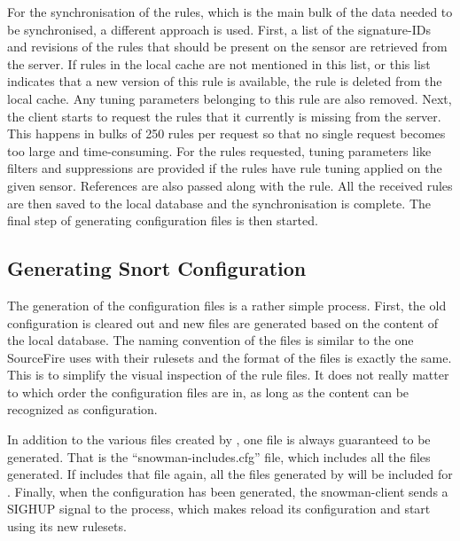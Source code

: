 For the synchronisation of the rules, which is the main bulk of the data needed
to be synchronised, a different approach is used. First, a list of the
signature-IDs and revisions of the rules that should be present on the sensor
are retrieved from the server. If rules in the local cache are not mentioned in
this list, or this list indicates that a new version of this rule is available,
the rule is deleted from the local cache. Any tuning parameters belonging to
this rule are also removed. Next, the client starts to request the rules that it
currently is missing from the server. This happens in bulks of 250 rules per
request so that no single request becomes too large and time-consuming. For the
rules requested, tuning parameters like filters and suppressions are provided if
the rules have rule tuning applied on the given sensor. References are also
passed along with the rule. All the received rules are then saved to the local
database and the synchronisation is complete. The final step of generating
\snort{} configuration files is then started.

\subsection{Generating Snort Configuration}
The generation of the \snort{} configuration files is a rather simple process.
First, the old configuration is cleared out and new files are generated based on
the content of the local database. The naming convention of the files is similar
to the one SourceFire uses with their rulesets and the format of the files is
exactly the same. This is to simplify the visual inspection of the rule files.
It does not really matter to \snort{} which order the configuration files are
in, as long as the content can be recognized as \snort{} configuration.

In addition to the various files created by \snowman{}, one file is always
guaranteed to be generated. That is the ``snowman-includes.cfg'' file, which
includes all the files generated. If \snort{} includes that file again, all the
files generated by \snowman{} will be included for \snort{}. Finally, when the
configuration has been generated, the snowman-client sends a SIGHUP signal to
the \snort{} process, which makes \snort{} reload its configuration and start
using its new rulesets.
